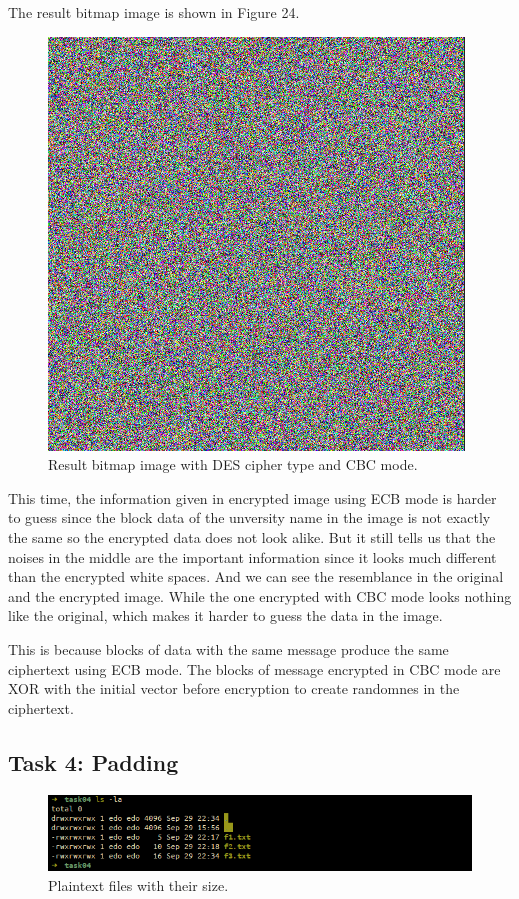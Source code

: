 \documentclass{article}
\begin{document}
\begin{itemize}
        The result bitmap image is shown in Figure 24.

        \begin{figure}[!ht]
            \centering
            \includegraphics[scale=0.68]{iit_cbc.png}
            \caption{Result bitmap image with DES cipher type and CBC mode.}
        \end{figure}
\end{itemize}

This time, the information given in encrypted image using ECB mode is harder to
guess since the block data of the unversity name in the image is not exactly
the same so the encrypted data does not look alike. But it still tells us that
the noises in the middle are the important information since it looks much different
than the encrypted white spaces. And we can see the resemblance in the original and
the encrypted image. While the one encrypted with CBC mode looks nothing like
the original, which makes it harder to guess the data in the image.

This is because blocks of data with the same message produce the same
ciphertext using ECB mode. The blocks of message encrypted in
CBC mode are XOR with the initial vector before encryption to create randomnes
in the ciphertext.

\subsection{Task 4: Padding}

\begin{figure}[!ht]
    \centering
    \includegraphics[scale=0.68]{task04_plaintext_files.png}
    \caption{Plaintext files with their size.}
\end{figure}
\end{document}
